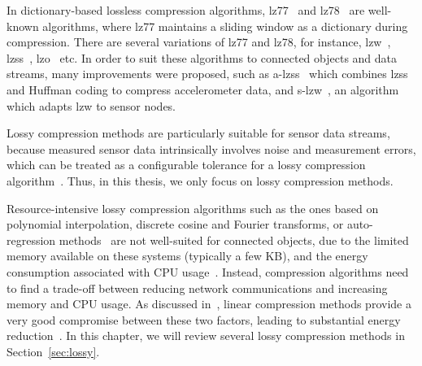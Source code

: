 In
dictionary-based lossless compression algorithms,
\acrfull{lz77}~\cite{ziv1977universal} and
\acrfull{lz78}~\cite{ziv1978compression} are well-known algorithms, where
\acrshort{lz77} maintains a sliding window as a dictionary during compression.
There are several variations of \acrshort{lz77} and \acrshort{lz78}, for
instance, \acrfull{lzw}~\cite{sadler2006data},
\acrfull{lzss}~\cite{storer1982data}, \acrfull{lzo}~\cite{lzocite} etc. In order
to suit these algorithms to connected objects and data streams, many improvements
were proposed, such as \acrfull{a-lzss}~\cite{pope2018accelerometer}
which combines \acrshort{lzss} and Huffman coding to compress accelerometer
data, and \acrfull{s-lzw}~\cite{sadler2006data}, an algorithm which adapts
\acrshort{lzw} to sensor nodes.

Lossy compression methods are particularly suitable for sensor data
streams, because measured sensor data intrinsically involves noise and
measurement errors, which can be treated as a configurable tolerance for a
lossy compression algorithm~\cite{li2018multi}. Thus, in this thesis, we
only focus on lossy compression methods.

Resource-intensive lossy compression algorithms such as the ones based on
polynomial interpolation, discrete cosine and Fourier transforms, or
auto-regression methods~\cite{lu2010optimized} are not well-suited for connected
objects, due to the limited memory available on these systems (typically a few
KB), and the energy consumption associated with CPU usage~\cite{li2018multi}.
Instead, compression algorithms need to find a trade-off between reducing
network communications and increasing memory and CPU usage. As discussed
in~\cite{zordan2014performance}, linear compression methods provide a very good
compromise between these two factors, leading to substantial energy
reduction~\cite{li2018multi}. In this chapter, we will review several lossy
compression methods in Section~\ref{sec:lossy}.
